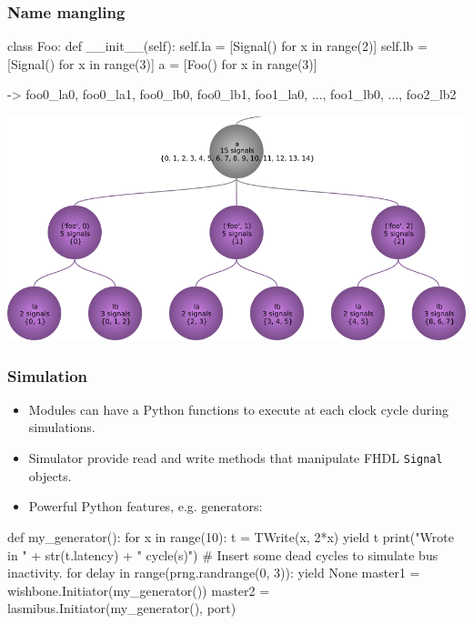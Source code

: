 \documentclass[serif,mathserif]{beamer}
\begin{document}
\begin{frame}[fragile]
\frametitle{Name mangling}
\begin{verbatimtab}
class Foo:
    def __init__(self):
        self.la = [Signal() for x in range(2)]
        self.lb = [Signal() for x in range(3)]
a = [Foo() for x in range(3)]

-> foo0_la0, foo0_la1, foo0_lb0, foo0_lb1, foo1_la0, ...,
  foo1_lb0, ..., foo2_lb2
\end{verbatimtab}
\end{frame}

\begin{frame}
\centering \includegraphics[width=\textwidth]{name_mangling.png}
\end{frame}

\begin{frame}[fragile]
\frametitle{Simulation}
\begin{itemize}
\item Modules can have a Python functions to execute at each clock cycle during simulations.
\item Simulator provide read and write methods that manipulate FHDL \verb!Signal! objects.
\item Powerful Python features, e.g. generators:
\end{itemize}
\begin{verbatimtab}
def my_generator():
        for x in range(10):
                t = TWrite(x, 2*x)
                yield t
                print("Wrote in " + str(t.latency) + " cycle(s)")
                # Insert some dead cycles to simulate bus inactivity.
                for delay in range(prng.randrange(0, 3)):
                        yield None
master1 = wishbone.Initiator(my_generator())
master2 = lasmibus.Initiator(my_generator(), port)
\end{verbatimtab}
\end{frame}
\end{document}
